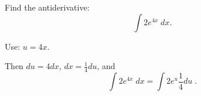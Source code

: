 \documentclass{ximera}
\author{Emma Smith Zbarsky\and Nela Lakos}
\begin{document}
\begin{exercise}

Find the antiderivative: \[\int 2e^{4x}\; dx.\]


\begin{hint}
Use: $u=4x$.
\end{hint}


\begin{hint}
Then $du=4 dx$, $dx=\frac{1}{4} du$, and 
\[\int 2e^{4x}\; dx=\int 2e^{u}\frac{1}{4} du\;.\]
\end{hint}


\begin{multipleChoice}
\end{multipleChoice}

\end{exercise}
\end{document}

